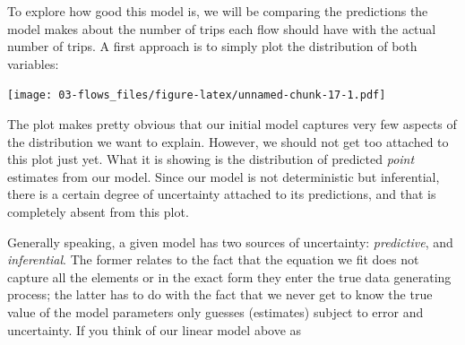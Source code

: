 \documentclass[]{book}
\newenvironment{Shaded}{\begin{snugshade}}{\end{snugshade}}
\newcommand{\KeywordTok}[1]{\textcolor[rgb]{0.13,0.29,0.53}{\textbf{#1}}}
\newcommand{\DataTypeTok}[1]{\textcolor[rgb]{0.13,0.29,0.53}{#1}}
\newcommand{\DecValTok}[1]{\textcolor[rgb]{0.00,0.00,0.81}{#1}}
\newcommand{\StringTok}[1]{\textcolor[rgb]{0.31,0.60,0.02}{#1}}
\newcommand{\OperatorTok}[1]{\textcolor[rgb]{0.81,0.36,0.00}{\textbf{#1}}}
\newcommand{\NormalTok}[1]{#1}
\begin{document}
To explore how good this model is, we will be comparing the predictions
the model makes about the number of trips each flow should have with the
actual number of trips. A first approach is to simply plot the
distribution of both variables:

\begin{Shaded}
\end{Shaded}

\texttt{[image: 03-flows\_files/figure-latex/unnamed-chunk-17-1.pdf]}

The plot makes pretty obvious that our initial model captures very few
aspects of the distribution we want to explain. However, we should not
get too attached to this plot just yet. What it is showing is the
distribution of predicted \emph{point} estimates from our model. Since
our model is not deterministic but inferential, there is a certain
degree of uncertainty attached to its predictions, and that is
completely absent from this plot.

Generally speaking, a given model has two sources of uncertainty:
\emph{predictive}, and \emph{inferential}. The former relates to the
fact that the equation we fit does not capture all the elements or in
the exact form they enter the true data generating process; the latter
has to do with the fact that we never get to know the true value of the
model parameters only guesses (estimates) subject to error and
uncertainty. If you think of our linear model above as
\end{document}
